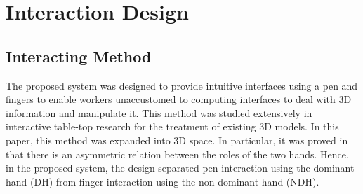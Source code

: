 
\section{Interaction Design}

\subsection{Interacting Method}





The proposed system was designed to provide intuitive interfaces using a pen and fingers to enable workers unaccustomed to computing interfaces to deal with 3D information and manipulate it. This method was studied extensively in interactive table-top research \cite{brandl_combining_2008} for the treatment of existing 3D models. In this paper, this method was expanded into 3D space. In particular, it was proved in \cite{guiard_asymmetric_1987} that there is an asymmetric relation between the roles of the two hands. Hence, in the proposed system, the design separated pen interaction using the dominant hand (DH) from finger interaction using the non-dominant hand (NDH).

